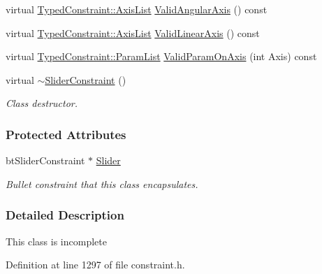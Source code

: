 \begin{DoxyCompactItemize}
\item 
virtual \hyperlink{classMezzanine_1_1TypedConstraint_ac6b8e0839cd686f73d0c9e9ad5db47a4}{TypedConstraint::AxisList} \hyperlink{classMezzanine_1_1SliderConstraint_ac96a0956a0cb82b4b37d0da3a9d348fa}{ValidAngularAxis} () const 
\item 
virtual \hyperlink{classMezzanine_1_1TypedConstraint_ac6b8e0839cd686f73d0c9e9ad5db47a4}{TypedConstraint::AxisList} \hyperlink{classMezzanine_1_1SliderConstraint_ac238c09e330b22833bd666a73b93f8d0}{ValidLinearAxis} () const 
\item 
virtual \hyperlink{classMezzanine_1_1TypedConstraint_abd499db29c9e9755e9bb547d29eaa49a}{TypedConstraint::ParamList} \hyperlink{classMezzanine_1_1SliderConstraint_a6883d8b39517a5a96c099b1d1b441d95}{ValidParamOnAxis} (int Axis) const 
\item 
virtual \hyperlink{classMezzanine_1_1SliderConstraint_a61867229e5eb1192119b496b12beb825}{$\sim$SliderConstraint} ()
\begin{DoxyCompactList}\small\item\em Class destructor. \item\end{DoxyCompactList}\end{DoxyCompactItemize}
\subsubsection*{Protected Attributes}
\begin{DoxyCompactItemize}
\item 
\hypertarget{classMezzanine_1_1SliderConstraint_ad0efdaf32b9de3085d2fef36020e0cb2}{
btSliderConstraint $\ast$ \hyperlink{classMezzanine_1_1SliderConstraint_ad0efdaf32b9de3085d2fef36020e0cb2}{Slider}}
\label{classMezzanine_1_1SliderConstraint_ad0efdaf32b9de3085d2fef36020e0cb2}

\begin{DoxyCompactList}\small\item\em Bullet constraint that this class encapsulates. \item\end{DoxyCompactList}\end{DoxyCompactItemize}


\subsubsection{Detailed Description}
This class is incomplete 

Definition at line 1297 of file constraint.h.



